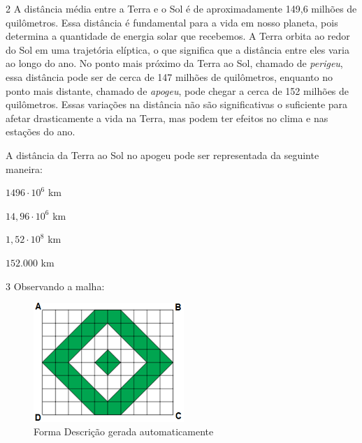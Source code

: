 {{{\begin{escolha}
{{{{\begin{escolha}
\begin{escolha}
{{\begin{enumerate}
{\num{2} A distância média entre a Terra e o Sol é de aproximadamente 149,6
milhões de quilômetros. Essa distância é fundamental para a vida em
nosso planeta, pois determina a quantidade de energia solar que
recebemos. A Terra orbita ao redor do Sol em uma trajetória elíptica,
o que significa que a distância entre eles varia ao longo do ano. No
ponto mais próximo da Terra ao Sol, chamado de \textit{perigeu}, essa distância
pode ser de cerca de 147 milhões de quilômetros, enquanto no ponto
mais distante, chamado de \textit{apogeu}, pode chegar a cerca de 152 milhões
de quilômetros. Essas variações na distância não são significativas o
suficiente para afetar drasticamente a vida na Terra, mas podem ter
efeitos no clima e nas estações do ano.

A distância da Terra ao Sol no apogeu pode ser representada da seguinte maneira:

\begin{escolha}

  \item $1496 \cdot 10^{6}$ km 

  \item $14,96 \cdot 10^{6}$ km 

  \item $1,52 \cdot 10^{8}$ km 

  \item $152.000$ km

\end{escolha}


\num{3} Observando a malha:

\begin{figure}
\centering
\includegraphics[width=2.23809in,height=1.77753in]{./_SAEB_9_MAT/media/image240.png}
\caption{Forma Descrição gerada automaticamente}
\end{figure}

}
\end{enumerate}}}
\end{escolha}
\end{escolha}}}}}
\end{escolha}}}}
